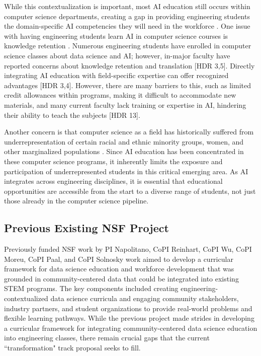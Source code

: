 \documentclass[11pt]{article}
\begin{document}
While this contextualization is important, most AI education still occurs within computer science departments, creating a gap in providing engineering students the domain-specific AI competencies they will need in the workforce \cite{xxx}.
One issue with having engineering students learn AI in computer science courses is knowledge retention \cite{menekse2023envisioning}. 
Numerous engineering students have enrolled in computer science classes about data science and AI; however, in-major faculty have reported concerns about knowledge retention and translation [HDR 3,5].
Directly integrating AI education with field-specific expertise can offer recognized advantages [HDR 3,4]. However, there are many barriers to this, such as limited credit allowances within programs, making it difficult to accommodate new materials, and many current faculty lack training or expertise in AI, hindering their ability to teach the subjects [HDR 13]. 

Another concern is that computer science as a field has historically suffered from underrepresentation of certain racial and ethnic minority groups, women, and other marginalized populations \cite{aspray2016broadening, beyer2014women, scott2017broadening, charleston2014navigating}. 
Since AI education has been concentrated in these computer science programs, it inherently limits the exposure and participation of underrepresented students in this critical emerging area. 
As AI integrates across engineering disciplines, it is essential that educational opportunities are accessible from the start to a diverse range of students\cite{walsh2022aspiring}, not just those already in the computer science pipeline.

\subsection{Previous Existing NSF Project}
Previously funded NSF work by PI Napolitano, CoPI Reinhart, CoPI Wu, CoPI Moreu, CoPI Paal, and CoPI Solnosky work aimed to develop a curricular framework for data science education and workforce development that was grounded in community-centered data that could be integrated into existing STEM programs.
The key components included creating engineering-contextualized data science curricula and engaging community stakeholders, industry partners, and student organizations to provide real-world problems and flexible learning pathways.
While the previous project made strides in developing a curricular framework for integrating community-centered data science education into engineering classes, there remain crucial gaps that the current ``transformation" track proposal seeks to fill. 
\end{document}
